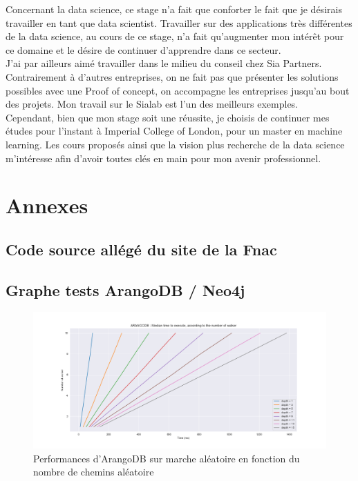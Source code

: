 \documentclass{article} %
\begin{document}
Concernant la data science, ce stage n’a fait que conforter le fait que je
désirais travailler en tant que data scientist. Travailler sur des applications très
différentes de la data science, au cours de ce stage, n’a fait qu’augmenter mon intérêt
pour ce domaine et le désire de continuer d’apprendre dans ce secteur.\\

J'ai par ailleurs aimé travailler dans le milieu du conseil chez Sia Partners. Contrairement à d'autres entreprises, on ne fait pas que présenter les solutions possibles avec une Proof of concept, on accompagne les entreprises jusqu'au bout des projets. Mon travail sur le Sialab est l'un des meilleurs exemples.\\

Cependant, bien que mon stage soit une réussite, je choisis de continuer mes études pour l'instant à Imperial College of London, pour un master en machine learning. Les cours proposés ainsi que la vision plus recherche de la data science m'intéresse afin d'avoir toutes clés en main pour mon avenir professionnel.


\newpage

\section{Annexes}
\subsection{Code source allégé du site de la Fnac}
%
\newpage
\subsection{Graphe tests ArangoDB / Neo4j}

\begin{figure}[!h]
 \centering
 \includegraphics[keepaspectratio = true,scale=0.4]{arangoDB_nbwalker_time.png}
 \caption{Performances d'ArangoDB sur marche aléatoire en fonction du nombre de chemins aléatoire}
 \label{fig:arwalk}
\end{figure}
\end{document}
